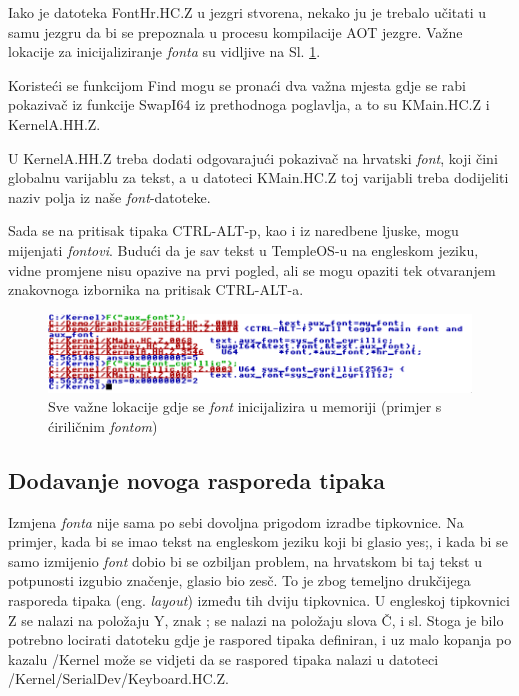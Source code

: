 \documentclass{foi}
\begin{document}
Iako je datoteka {\selectfont FontHr.HC.Z} u jezgri stvorena, nekako ju je trebalo učitati u samu jezgru da bi se prepoznala u procesu kompilacije AOT jezgre. Važne lokacije za inicijaliziranje \emph{fonta} su vidljive na Sl. \ref{fig:fontloc}.

Koristeći se funkcijom {\selectfont Find} mogu se pronaći dva važna mjesta gdje se rabi pokazivač iz funkcije {\selectfont SwapI64} iz prethodnoga poglavlja, a to su {\selectfont KMain.HC.Z} i {\selectfont KernelA.HH.Z}.

U {\selectfont KernelA.HH.Z} treba dodati odgovarajući pokazivač na hrvatski \emph{font}, koji čini globalnu varijablu za tekst, a u datoteci {\selectfont KMain.HC.Z} toj varijabli treba dodijeliti naziv polja iz naše \emph{font}-datoteke.

Sada se na pritisak tipaka {\selectfont CTRL-ALT-p}, kao i iz naredbene ljuske, mogu mijenjati \emph{fontovi}. Budući da je sav tekst u TempleOS-u na engleskom jeziku, vidne promjene nisu opazive na prvi pogled, ali se mogu opaziti tek otvaranjem znakovnoga izbornika na pritisak {\selectfont CTRL-ALT-a}.

\begin{figure}[H]
    \centering
    \includegraphics[width=1.0\textwidth]{slike/lokacijeFonta.png}
	\caption{Sve važne lokacije gdje se \emph{font} inicijalizira u memoriji (primjer s ćiriličnim \emph{fontom})}
    \label{fig:fontloc}
\end{figure}

\subsection{Dodavanje novoga rasporeda tipaka}

Izmjena \emph{fonta} nije sama po sebi dovoljna prigodom izradbe tipkovnice. Na primjer, kada bi se imao tekst na engleskom jeziku koji bi glasio {\selectfont yes;}, i kada bi se samo izmijenio \emph{font} dobio bi se ozbiljan problem, na hrvatskom bi taj tekst u potpunosti izgubio značenje, glasio bio {\selectfont zesč}. To je zbog temeljno drukčijega rasporeda tipaka (eng. \emph{layout}) između tih dviju tipkovnica. U engleskoj tipkovnici {\selectfont Z} se nalazi na položaju {\selectfont Y}, znak {\selectfont ;} se nalazi na položaju slova {\selectfont Č}, i sl. Stoga je bilo potrebno locirati datoteku gdje je raspored tipaka definiran, i uz malo kopanja po kazalu {\selectfont /Kernel} može se vidjeti da se raspored tipaka nalazi u datoteci {\selectfont /Kernel/SerialDev/Keyboard.HC.Z}.
\end{document}
